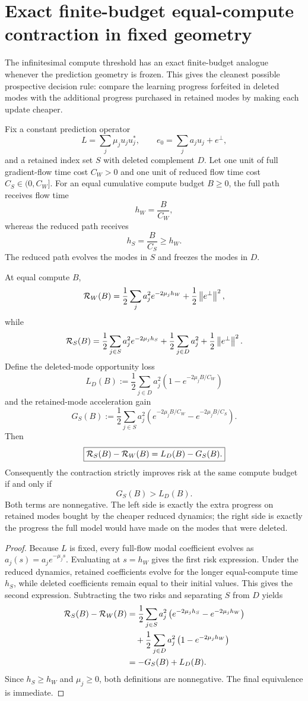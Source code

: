 \section{Exact finite-budget equal-compute contraction in fixed geometry}
The infinitesimal compute threshold has an exact finite-budget analogue whenever the prediction geometry is frozen. This gives the cleanest possible prospective decision rule: compare the learning progress forfeited in deleted modes with the additional progress purchased in retained modes by making each update cheaper.

Fix a constant prediction operator
\[
L=\sum_j\mu_j u_ju_j^\ast,
\qquad
 e_0=\sum_j a_ju_j+e^\perp,
\]
and a retained index set $S$ with deleted complement $D$. Let one unit of full gradient-flow time cost $C_W>0$ and one unit of reduced flow time cost $C_S\in(0,C_W]$. For an equal cumulative compute budget $B\ge0$, the full path receives flow time
\[
h_W=\frac{B}{C_W},
\]
whereas the reduced path receives
\[
h_S=\frac{B}{C_S}\ge h_W.
\]
The reduced path evolves the modes in $S$ and freezes the modes in $D$.

\begin{theorem}\label{thm:fixed-equal-compute}
At equal compute $B$,
\[
\mathcal R_W(B)
=
\frac12\sum_j a_j^2e^{-2\mu_jh_W}
+\frac12\left\lVert e^\perp\right\rVert^2,
\]
while
\[
\mathcal R_S(B)
=
\frac12\sum_{j\in S}a_j^2e^{-2\mu_jh_S}
+\frac12\sum_{j\in D}a_j^2
+\frac12\left\lVert e^\perp\right\rVert^2.
\]
Define the deleted-mode opportunity loss
\[
L_D(B)
:=
\frac12\sum_{j\in D}a_j^2
\left(1-e^{-2\mu_jB/C_W}\right)
\]
and the retained-mode acceleration gain
\[
G_S(B)
:=
\frac12\sum_{j\in S}a_j^2
\left(
 e^{-2\mu_jB/C_W}
-e^{-2\mu_jB/C_S}
\right).
\]
Then
\[
\boxed{
\mathcal R_S(B)-\mathcal R_W(B)=L_D(B)-G_S(B).}
\]
Consequently the contraction strictly improves risk at the same compute budget if and only if
\[
\boxed{G_S(B)>L_D(B).}
\]
Both terms are nonnegative. The left side is exactly the extra progress on retained modes bought by the cheaper reduced dynamics; the right side is exactly the progress the full model would have made on the modes that were deleted.
\end{theorem}

\begin{proof}
Because $L$ is fixed, every full-flow modal coefficient evolves as
$a_j(s)=a_je^{-\mu_js}$. Evaluating at $s=h_W$ gives the first risk expression. Under the reduced dynamics, retained coefficients evolve for the longer equal-compute time $h_S$, while deleted coefficients remain equal to their initial values. This gives the second expression. Subtracting the two risks and separating $S$ from $D$ yields
\begin{align*}
\mathcal R_S(B)-\mathcal R_W(B)
&=
\frac12\sum_{j\in S}a_j^2
\left(e^{-2\mu_jh_S}-e^{-2\mu_jh_W}\right)\\
&\quad+
\frac12\sum_{j\in D}a_j^2
\left(1-e^{-2\mu_jh_W}\right)\\
&=-G_S(B)+L_D(B).
\end{align*}
Since $h_S\ge h_W$ and $\mu_j\ge0$, both definitions are nonnegative. The final equivalence is immediate.
\end{proof}

